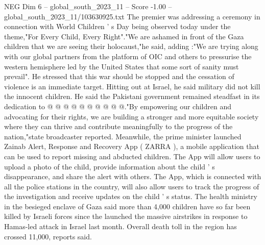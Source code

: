 \begin{textsample}{NEG Dim 6 – global\_south\_2023\_11 – Score -1.00 – global\_south\_2023\_11/103630925.txt}
The premier was addressing a ceremony in connection with World Children ' s Day being observed today under the theme,"For Every Child, Every Right"."We are ashamed in front of the Gaza children that we are seeing their holocaust,"he said, adding :"We are trying along with our global partners from the platform of OIC and others to pressurise the western hemisphere led by the United States that some sort of sanity must prevail".
He stressed that this war should be stopped and the cessation of violence is an immediate target.
Hitting out at Israel, he said military did not kill the innocent children.
He said the Pakistani government remained steadfast in its dedication to @ @ @ @ @ @ @ @ @ @."By empowering our children and advocating for their rights, we are building a stronger and more equitable society where they can thrive and contribute meaningfully to the progress of the nation,"state broadcaster reported.
Meanwhile, the prime minister launched Zainab Alert, Response and Recovery App ( ZARRA ), a mobile application that can be used to report missing and abducted children.
The App will allow users to upload a photo of the child, provide information about the child ' s disappearance, and share the alert with others.
The App, which is connected with all the police stations in the country, will also allow users to track the progress of the investigation and receive updates on the child ' s status.
The health ministry in the besieged enclave of Gaza said more than 4,000 children have so far been killed by Israeli forces since the launched the massive airstrikes in response to Hamas-led attack in Israel last month.
Overall death toll in the region has crossed 11,000, reports said.

\end{textsample}

